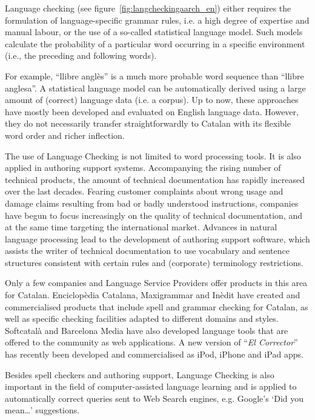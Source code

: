 \begin{multicols}{2}
Language checking (see figure~\ref{fig:langcheckingaarch_en}) either requires the formulation of language-specific grammar rules, i.e. a high degree of expertise and manual labour, or the use of a so-called statistical language model. Such models calculate the probability of a particular word occurring in a specific environment (i.e., the preceding and following words).

For example, ``llibre anglès'' is a much more probable word sequence than ``llibre anglesa''. A statistical language model can be automatically derived using a large amount of (correct) language data (i.e. a corpus). Up to now, these approaches have mostly been developed and evaluated on English language data. However, they do not necessarily transfer straightforwardly to Catalan with its flexible word order and richer inflection. 

The use of Language Checking is not limited to word processing tools. It is also applied in authoring support systems. Accompanying the rising number of technical products, the amount of technical documentation has rapidly increased over the last decades. Fearing customer complaints about wrong usage and damage claims resulting from bad or badly understood instructions, companies have begun to focus increasingly on the quality of technical documentation, and at the same time targeting the international market. Advances in natural language processing lead to the development of authoring support software, which assists the writer of technical documentation to use vocabulary and sentence structures consistent with certain rules and (corporate) terminology restrictions.


Only a few companies and Language Service Providers offer products in this area for Catalan. Enciclopèdia Catalana, Maxigrammar and Inèdit have created and commercialised products that include spell and grammar checking for Catalan, as well as specific checking facilities adapted to different domains and styles. Softcatalà and Barcelona Media have also developed language tools that are offered to the community as web applications. A new version of “\textit{El Corrector}” has recently been developed and commercialised as iPod, iPhone and iPad apps. 

Besides spell checkers and authoring support, Language Checking is also important in the field of computer-assisted language learning and is applied to automatically correct queries sent to Web Search engines, e.g. Google’s ‘Did you mean…’ suggestions. 


\end{multicols}
